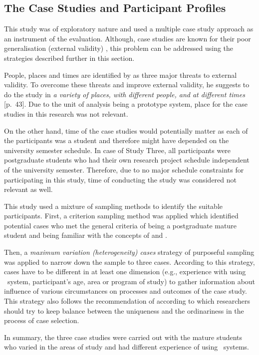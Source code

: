 \subsection{The Case Studies and Participant Profiles}

This study was of exploratory nature and used a multiple case study approach as
an instrument of the evaluation. Although, case studies are known for their poor
generalisation (external validity) \citep{Stake1995}, this problem can be
addressed using the strategies described further in this section.

People, places and times are identified by \citet{Trochim2001} as three major
threats to external validity. To overcome these threats and improve external
validity, he suggests to do the study in \textit{a variety of places, with
different people, and at different times} [p.~43]. Due to the unit of analysis
being a prototype system, place for the case studies in this research was not
relevant. 

On the other hand, time of the case studies would potentially matter as each of
the participants was a student and therefore might have depended on the
university semester schedule. In case of Study Three, all participants were
postgraduate students who had their own research project schedule independent of
the university semester. Therefore, due to no major schedule constraints for
participating in this study, time of conducting the study was considered not
relevant as well. 

This study used a mixture of sampling methods to identify the suitable
participants. First, a criterion sampling method was applied which identified
potential cases who met the general criteria of being a postgraduate mature
student and being familiar with the concepts of \LLLs and \ep.

Then, a \textit{maximum variation (heterogeneity) cases} strategy of purposeful
sampling \citep{Flyvbjerg2006,Patton2002} was applied to narrow down the sample
to three cases. According to this strategy, cases have to be different in at
least one dimension (e.g., experience with using \ep~system, participant's age,
area or program of study) to gather information about influence of various
circumstances on processes and outcomes of the case study. This strategy also
follows the recommendation of \citet{Stake1995} according to which researchers
should try to keep balance between the uniqueness and the ordinariness in the
process of case selection.

In summary, the three case studies were carried out with the mature students who
varied in the areas of study and had different experience of using \ep~systems.

